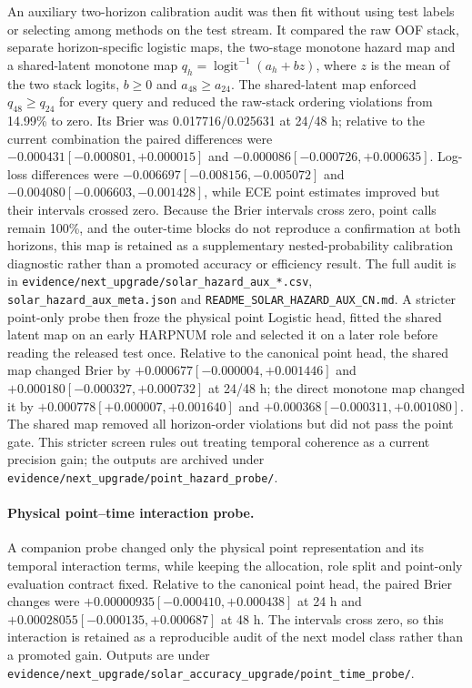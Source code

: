 \documentclass[11pt,a4paper]{article}
\numberwithin{equation}{section}
\theoremstyle{definition}\newtheorem{definition}[theorem]{Definition}
\theoremstyle{remark}\newtheorem{remark}[theorem]{Remark}
\begin{document}
An auxiliary two-horizon calibration audit was then fit without using test labels or selecting among methods on the test stream. It compared the raw OOF stack, separate horizon-specific logistic maps, the two-stage monotone hazard map and a shared-latent monotone map $q_h=\operatorname{logit}^{-1}(a_h+bz)$, where $z$ is the mean of the two stack logits, $b\geq0$ and $a_{48}\geq a_{24}$. The shared-latent map enforced $q_{48}\geq q_{24}$ for every query and reduced the raw-stack ordering violations from 14.99\% to zero. Its Brier was 0.017716/0.025631 at 24/48 h; relative to the current combination the paired differences were $-0.000431[-0.000801,+0.000015]$ and $-0.000086[-0.000726,+0.000635]$. Log-loss differences were $-0.006697[-0.008156,-0.005072]$ and $-0.004080[-0.006603,-0.001428]$, while ECE point estimates improved but their intervals crossed zero. Because the Brier intervals cross zero, point calls remain 100\%, and the outer-time blocks do not reproduce a confirmation at both horizons, this map is retained as a supplementary nested-probability calibration diagnostic rather than a promoted accuracy or efficiency result. The full audit is in \texttt{evidence/next\_upgrade/solar\_hazard\_aux\_*.csv}, \texttt{solar\_hazard\_aux\_meta.json} and \texttt{README\_SOLAR\_HAZARD\_AUX\_CN.md}. A stricter point-only probe then froze the physical point Logistic head, fitted the shared latent map on an early HARPNUM role and selected it on a later role before reading the released test once. Relative to the canonical point head, the shared map changed Brier by $+0.000677[-0.000004,+0.001446]$ and $+0.000180[-0.000327,+0.000732]$ at 24/48 h; the direct monotone map changed it by $+0.000778[+0.000007,+0.001640]$ and $+0.000368[-0.000311,+0.001080]$. The shared map removed all horizon-order violations but did not pass the point gate. This stricter screen rules out treating temporal coherence as a current precision gain; the outputs are archived under \texttt{evidence/next\_upgrade/point\_hazard\_probe/}.

\paragraph{Physical point--time interaction probe.}
A companion probe changed only the physical point representation and its temporal interaction terms, while keeping the allocation, role split and point-only evaluation contract fixed. Relative to the canonical point head, the paired Brier changes were $+0.00000935[-0.000410,+0.000438]$ at 24 h and $+0.00028055[-0.000135,+0.000687]$ at 48 h. The intervals cross zero, so this interaction is retained as a reproducible audit of the next model class rather than a promoted gain. Outputs are under \texttt{evidence/next\_upgrade/solar\_accuracy\_upgrade/point\_time\_probe/}.
\end{document}
